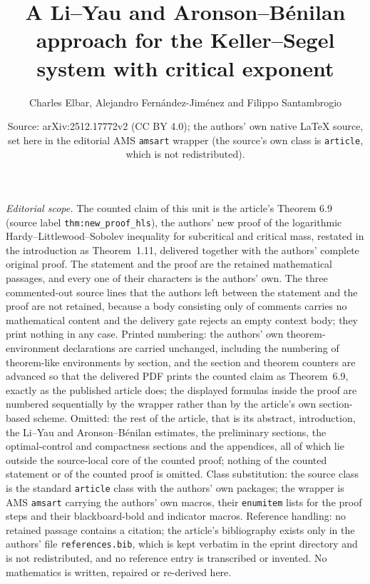 \documentclass[10pt,a4paper]{amsart}
\title{A Li--Yau and Aronson--B\'enilan approach for the Keller--Segel system with critical exponent}
\author{Charles Elbar, Alejandro Fernández-Jiménez and Filippo Santambrogio}
\date{Source: arXiv:2512.17772v2 (CC BY 4.0); the authors' own native \LaTeX{} source, set here in the editorial AMS \texttt{amsart} wrapper (the source's own class is \texttt{article}, which is not redistributed).}
\theoremstyle{plain}
\theoremstyle{remark}
\begin{document}
\maketitle
\noindent\textit{Editorial scope.} The counted claim of this unit is the article's Theorem 6.9 (source label \texttt{thm:new\_proof\_hls}), the authors' new proof of the logarithmic Hardy--Littlewood--Sobolev inequality for subcritical and critical mass, restated in the introduction as Theorem~1.11, delivered together with the authors' complete original proof. The statement and the proof are the retained mathematical passages, and every one of their characters is the authors' own. The three commented-out source lines that the authors left between the statement and the proof are not retained, because a body consisting only of comments carries no mathematical content and the delivery gate rejects an empty context body; they print nothing in any case. Printed numbering: the authors' own theorem-environment declarations are carried unchanged, including the numbering of theorem-like environments by section, and the section and theorem counters are advanced so that the delivered PDF prints the counted claim as Theorem~6.9, exactly as the published article does; the displayed formulas inside the proof are numbered sequentially by the wrapper rather than by the article's own section-based scheme. Omitted: the rest of the article, that is its abstract, introduction, the Li--Yau and Aronson--B\'enilan estimates, the preliminary sections, the optimal-control and compactness sections and the appendices, all of which lie outside the source-local core of the counted proof; nothing of the counted statement or of the counted proof is omitted. Class substitution: the source class is the standard \texttt{article} class with the authors' own packages; the wrapper is AMS \texttt{amsart} carrying the authors' own macros, their \texttt{enumitem} lists for the proof steps and their blackboard-bold and indicator macros. Reference handling: no retained passage contains a citation; the article's bibliography exists only in the authors' file \texttt{references.bib}, which is kept verbatim in the eprint directory and is not redistributed, and no reference entry is transcribed or invented. No mathematics is written, repaired or re-derived here.
\setcounter{section}{6}
\setcounter{theorem}{8}
\end{document}
